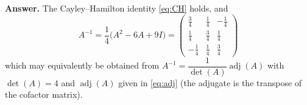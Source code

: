 \documentclass[journal]{IEEEtran}
\begin{document}
\bigskip
\noindent\textbf{Answer.} The Cayley--Hamilton identity \eqref{eq:CH} holds, and
\[
\boxed{\,A^{-1}=\frac{1}{4}\bigl(A^{2}-6A+9I\bigr)
=\begin{pmatrix}
\frac{3}{4} & \frac{1}{4} & -\frac{1}{4}\\[6pt]
\frac{1}{4} & \frac{3}{4} & \frac{1}{4}\\[6pt]
-\frac{1}{4} & \frac{1}{4} & \frac{3}{4}
\end{pmatrix}\,}
\]
which may equivalently be obtained from \(A^{-1}=\dfrac{1}{\det(A)}\operatorname{adj}(A)\) with \(\det(A)=4\) and \(\operatorname{adj}(A)\) given in \eqref{eq:adj} (the adjugate is the transpose of the cofactor matrix).
\end{document}

